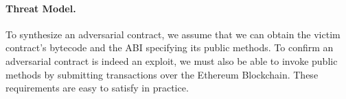 \paragraph{Threat Model.} To synthesize an adversarial contract,  we assume that
we can obtain the victim contract's bytecode and the ABI specifying its public
methods. To confirm an adversarial contract is indeed an exploit, we must also
be able to invoke public methods by submitting transactions over the Ethereum
Blockchain. These requirements are easy to satisfy in practice.
